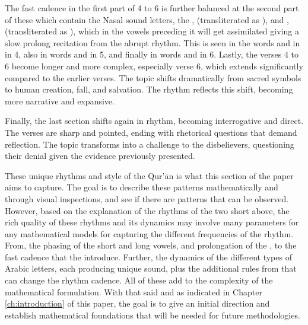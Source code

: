 The fast cadence in the first part of   4 to 6 is further balanced at the second part of these   which contain the Nasal sound letters, the  ,  (transliterated as ), and  ,  (transliterated as ), which in   the vowels preceding it will get assimilated giving a slow prolong recitation from the abrupt rhythm. This is seen in the words   and in   in   4, also in words   and   in   5, and finally in words   and   in   6. Lastly, the verses 4 to 6 become longer and more complex, especially verse 6, which extends significantly compared to the earlier verses. The topic shifts dramatically from sacred symbols to human creation, fall, and salvation. The rhythm reflects this shift, becoming more narrative and expansive.

Finally, the last section shifts again in rhythm, becoming interrogative and direct. The verses are sharp and pointed, ending with rhetorical questions that demand reflection. The topic transforms into a challenge to the disbelievers, questioning their denial given the evidence previously presented.

These unique rhythms and style of the Qur'\=an is what this section of the paper aims to capture. The goal is to describe these patterns mathematically and through visual inspections, and see if there are patterns that can be observed. However, based on the explanation of the rhythms of the two short   above, the rich quality of these rhythms and its dynamics may involve many parameters for any mathematical models for capturing the different frequencies of the rhythm. From, the phasing of the short and long vowels, and prolongation of the  , to the fast cadence that the   introduce. Further, the dynamics of the different types of Arabic letters, each producing unique sound, plus the additional rules from   that can change the rhythm cadence. All of these add to the complexity of the mathematical formulation. With that said and as indicated in Chapter \ref{ch:introduction} of this paper, the goal is to give an initial direction and establish mathematical foundations that will be needed for future methodologies.

